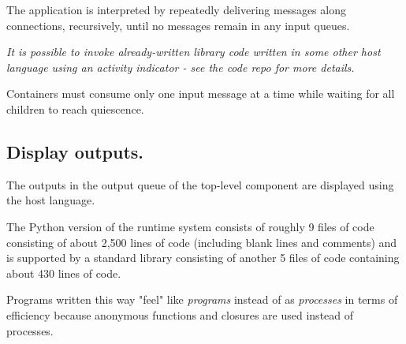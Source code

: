 \documentclass[10pt,anonymous,review]{acmart}
\begin{document}
The application is interpreted by repeatedly delivering messages along
connections, recursively, until no messages remain in any input queues.

\emph{It is possible to invoke already-written library code written in some other host language using an activity indicator - see the code repo for more details.}

Containers must consume only one input message at a time while waiting
for all children to reach quiescence.
%
  
\subsection{Display outputs.}

The outputs in the output queue of the top-level component are displayed
using the host language.
%
  

The Python version of the runtime system consists of roughly 9 files of
code consisting of about 2,500 lines of code (including blank lines and
comments) and is supported by a standard library consisting of another 5
files of code containing about 430 lines of code.

Programs written this way "feel" like
\emph{programs} instead of as \emph{processes} in terms of efficiency because anonymous functions and closures are used instead of processes.
\end{document}
